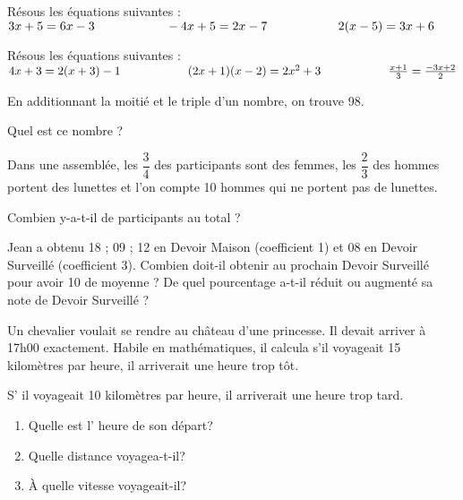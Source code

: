 \documentclass[10pt]{article}
\begin{document}
{\begin{Exo}
Résous les équations suivantes :
$
3x+5=6x-3\kern2cm-4x+5=2x-7\kern2cm2(x-5)=3x+6
$
\end{Exo}

\begin{Exo}
Résous les équations suivantes :
$
4x+3=2(x+3)-1\kern2cm (2x+1)(x-2)=2x^2+3\kern2cm \frac{x+1}3=\frac{-3x+2}2
$
\end{Exo}

\begin{Exo}
En additionnant la moitié et le triple d'un nombre, on trouve 98.
\par Quel est ce nombre ?
\end{Exo}

\begin{Exo}
Dans une assemblée, les $\dfrac34$ des participants sont des
femmes, les $\dfrac23$ des hommes portent des lunettes et l'on
compte 10 hommes qui ne portent pas de lunettes.
\par Combien y-a-t-il de participants au total ?
\end{Exo}

\begin{Exo}
Jean a obtenu 18 ; 09 ; 12 en Devoir Maison (coefficient 1) et 08 en
Devoir Surveillé (coefficient 3). Combien doit-il obtenir au prochain
Devoir Surveillé pour avoir 10 de moyenne ?  De quel pourcentage
a-t-il réduit ou augmenté sa note de Devoir Surveillé ?
\end{Exo}


\begin{Exo}
Un chevalier voulait se rendre au château d'une princesse. Il
devait arriver à 17h00 exactement. Habile en mathématiques, il
calcula s'il voyageait 15 kilomètres par heure, il arriverait une
heure trop tôt.

S' il voyageait 10 kilomètres par heure, il arriverait une heure
trop tard.\\
\begin{enumerate}
    \item Quelle est l' heure de son départ?
    \item Quelle distance voyagea-t-il?
    \item \`A quelle vitesse voyageait-il?
\end{enumerate}
\end{Exo}

}
\end{document}
